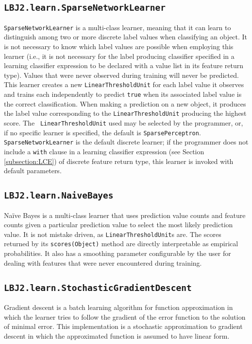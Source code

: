 \subsection{{\tt LBJ2.learn.SparseNetworkLearner}} \label{subsection:SNL}
{\tt SparseNetworkLearner} is a multi-class learner, meaning that it can learn
to distinguish among two or more discrete label values when classifying an
object.  It is not necessary to know which label values are possible when
employing this learner (i.e., it is not necessary for the label producing
classifier specified in a learning classifier expression to be declared with a
value list in its feature return type).  Values that were never observed
during training will never be predicted. \\

This learner creates a new {\tt LinearThresholdUnit} for each label value it
observes and trains each independently to predict {\tt true} when its
associated label value is the correct classification.  When making a
prediction on a new object, it produces the label value corresponding to the
{\tt LinearThresholdUnit} producing the highest score.  The {\tt
LinearThresholdUnit} used may be selected by the programmer, or, if no
specific learner is specified, the default is {\tt SparsePerceptron}. \\

{\tt SparseNetworkLearner} is the default discrete learner; if the programmer
does not include a {\tt with} clause in a learning classifier expression (see
Section \ref{subsection:LCE}) of discrete feature return type, this learner is
invoked with default parameters.

\subsection{{\tt LBJ2.learn.NaiveBayes}}
Na\"ive Bayes is a multi-class learner that uses prediction value counts and
feature counts given a particular prediction value to select the most likely
prediction value.  It is not mistake driven, as {\tt LinearThresholdUnit}s
are.  The scores returned by its {\tt scores(Object)} method are directly
interpretable as empirical probabilities.  It also has a smoothing parameter
configurable by the user for dealing with features that were never encountered
during training.

\subsection{{\tt LBJ2.learn.StochasticGradientDescent}}
Gradient descent is a batch learning algorithm for function approximation in
which the learner tries to follow the gradient of the error function to the
solution of minimal error.  This implementation is a stochastic approximation
to gradient descent in which the approximated function is assumed to have
linear form. \\

